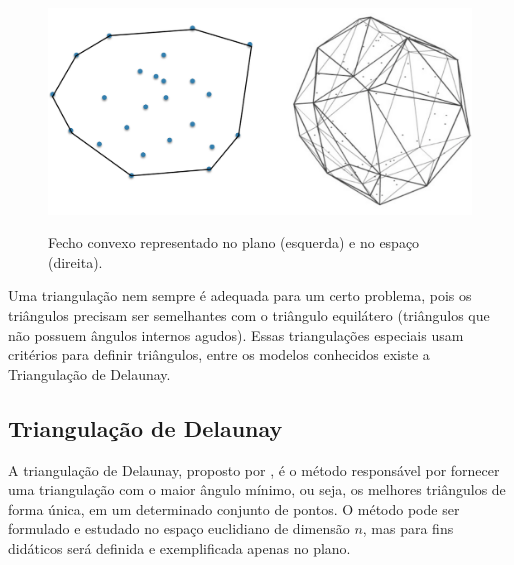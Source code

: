 \begin{figure}[H]
    \centering
    \caption{Fecho convexo representado no plano (esquerda) e no espaço (direita).}
    \includegraphics[scale=0.4]{dados/figuras/convex_hull.png}
    \label{fig:convex_hull}
\end{figure}

Uma triangulação nem sempre é adequada para um certo problema, pois os triângulos precisam ser semelhantes com o triângulo equilátero (triângulos que não possuem ângulos internos agudos). Essas triangulações especiais usam critérios para definir triângulos, entre os modelos conhecidos existe a Triangulação de Delaunay.


\subsection{Triangulação de Delaunay}
\label{sec:delaunay}
A triangulação de Delaunay, proposto por \cite{delaunay1934sphere}, é o método responsável por fornecer uma triangulação com o maior ângulo mínimo, ou seja, os melhores triângulos de forma única, em um determinado conjunto de pontos. O método pode ser formulado e estudado no espaço euclidiano de dimensão $n$, mas para fins didáticos será definida e exemplificada apenas no plano.

